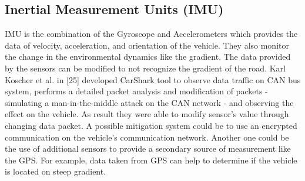 \subsection{Inertial Measurement Units (IMU)}
    IMU is the combination of the Gyroscope and Accelerometers which provides the data of velocity, acceleration, and orientation of the vehicle. They also monitor the change in the environmental dynamics like the gradient. The data provided by the sensors can be modified to not recognize the gradient of the road. 
    \newline
    Karl Koscher et al. in [25] developed CarShark tool to observe data traffic on CAN bus system, performs a detailed packet analysis and modification of packets - simulating a man-in-the-middle attack on the CAN network - and observing the effect on the vehicle. As result they were able to modify sensor’s value through changing data packet.
    \newline
    A possible mitigation system could be to use an encrypted communication on the vehicle’s communication network. Another one could be the use of additional sensors to provide a secondary source of measurement like the GPS. For example, data taken from GPS can help to determine if the vehicle is located on steep gradient.
